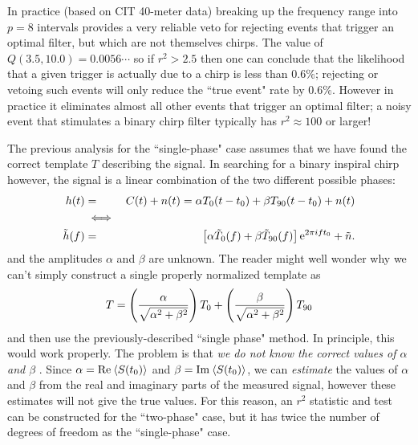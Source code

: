 In practice (based on CIT 40-meter data) breaking up the frequency
range into $p=8$ intervals provides a very reliable veto for rejecting
events that trigger an optimal filter, but which are not themselves
chirps.  The value of $Q(3.5,10.0) = 0.0056\cdots$ so if $r^2>2.5$ then
one can conclude that the likelihood that a given trigger is actually
due to a chirp is less than $0.6\%$; rejecting or vetoing such events
will only reduce the ``true event" rate by $0.6\%$.  However in practice
it eliminates almost all other events that trigger an optimal filter; a
noisy event that stimulates a binary chirp filter typically has $r^2
\approx 100$ or larger!

The previous analysis for the ``single-phase" case assumes that we have
found the correct template $T$ describing the signal.  In searching for
a binary inspiral chirp however, the signal is a linear combination of
the two different possible phases:
\begin{eqnarray}
\nonumber
h(t) & = & C(t) + n(t) = \alpha T_0(t-t_0) + \beta T_{90}(t-t_0)  +
n(t) \\
\nonumber
 & \iff & \\
\tilde h(f) & = &  \left[ \alpha \tilde T_0(f)  + \beta
\tilde T_{90}(f) \right] {\rm e}^{2 \pi i f t_0} + \tilde n.
\end{eqnarray}
and the amplitudes $\alpha$ and $\beta$ are unknown. 
The reader might well wonder why we can't simply construct a single properly
normalized template as
\begin{equation}
T = \left( {\alpha \over \sqrt{\alpha^2 + \beta^2}} \right) T_0 + \left(  {\beta \over
\sqrt{\alpha^2 + \beta^2}} \right) T_{90}
\end{equation}
and then use the previously-described ``single phase" method.
In principle, this would work properly.  The problem is that {\it we do
not know the correct values of $\alpha$ and $\beta$ }.  Since $\alpha =
{\rm Re} \> \langle  S(t_0) \rangle$ and  $\beta = {\rm Im} \> \langle
S(t_0) \rangle $, we can {\it estimate} the values of $\alpha$ and $\beta$
from the real and imaginary parts of the measured signal, however these
estimates will not give the true values.  For this reason, an $r^2$
statistic and test can be constructed for the ``two-phase" case, but it
has twice the number of degrees of freedom as the ``single-phase" case.

